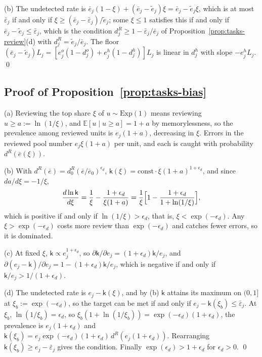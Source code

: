 (b) The undetected rate is $\bar e_j(1-\xi)+(\bar e_j-\tilde e_j)\xi=\bar e_j-\tilde e_j\xi$, which is at most $\bar\varepsilon_j$ if and only if $\xi\ge(\bar e_j-\bar\varepsilon_j)/\tilde e_j$; some $\xi\le 1$ satisfies this if and only if $\bar e_j-\tilde e_j\le\bar\varepsilon_j$, which is the condition $d^R_j\ge 1-\bar\varepsilon_j/\bar e_j$ of Proposition~\ref{prop:tasks-review}(d) with $d^R_j=\tilde e_j/\bar e_j$. The floor $(\bar e_j-\tilde e_j)L_j=[e^o_j(1-d^o_j)+e^h_j(1-d^h_j)]L_j$ is linear in $d^h_j$ with slope $-e^h_jL_j$. \qed

\subsection*{Proof of Proposition~\ref{prop:tasks-bias}}

(a) Reviewing the top share $\xi$ of $u\sim\mathrm{Exp}(1)$ means reviewing $u\ge a:=\ln(1/\xi)$, and $\mathbb E[u\mid u\ge a]=1+a$ by memorylessness, so the prevalence among reviewed units is $e_j(1+a)$, decreasing in $\xi$. Errors in the reviewed pool number $e_j\xi(1+a)$ per unit, and each is caught with probability $d^R(\bar e(\xi))$.

(b) With $d^R(\bar e)=d^R_0(\bar e/\bar e_0)^{\epsilon_d}$, $\mathsf k(\xi)=\mathrm{const}\cdot\xi(1+a)^{1+\epsilon_d}$, and since $da/d\xi=-1/\xi$,
\[
\frac{d\ln\mathsf k}{d\xi}=\frac1\xi-\frac{1+\epsilon_d}{\xi(1+a)}=\frac1\xi\Bigl[1-\frac{1+\epsilon_d}{1+\ln(1/\xi)}\Bigr],
\]
which is positive if and only if $\ln(1/\xi)>\epsilon_d$, that is, $\xi<\exp(-\epsilon_d)$. Any $\xi>\exp(-\epsilon_d)$ costs more review than $\exp(-\epsilon_d)$ and catches fewer errors, so it is dominated.

(c) At fixed $\xi$, $\mathsf k\propto e_j^{1+\epsilon_d}$, so $\partial\mathsf k/\partial e_j=(1+\epsilon_d)\mathsf k/e_j$, and $\partial(e_j-\mathsf k)/\partial e_j=1-(1+\epsilon_d)\mathsf k/e_j$, which is negative if and only if $\mathsf k/e_j>1/(1+\epsilon_d)$.

(d) The undetected rate is $e_j-\mathsf k(\xi)$, and by (b) $\mathsf k$ attains its maximum on $(0,1]$ at $\xi_b:=\exp(-\epsilon_d)$, so the target can be met if and only if $e_j-\mathsf k(\xi_b)\le\bar\varepsilon_j$. At $\xi_b$, $\ln(1/\xi_b)=\epsilon_d$, so $\xi_b(1+\ln(1/\xi_b))=\exp(-\epsilon_d)(1+\epsilon_d)$, the prevalence is $e_j(1+\epsilon_d)$ and $\mathsf k(\xi_b)=e_j\exp(-\epsilon_d)(1+\epsilon_d)\,d^R(e_j(1+\epsilon_d))$. Rearranging $\mathsf k(\xi_b)\ge e_j-\bar\varepsilon_j$ gives the condition. Finally $\exp(\epsilon_d)>1+\epsilon_d$ for $\epsilon_d>0$. \qed

